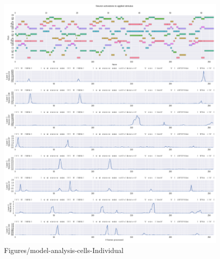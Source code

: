 \documentclass[dissertation.tex]{subfiles}
\begin{document}
\begin{figure}[htpb]
    \centering
    \includegraphics[width=1.0\linewidth]{Figures/model-analysis-cells-individual.png}
    \caption{Figures/model-analysis-cells-Individual}
    \label{fig:Figures/model-analysis-cells-individual}
\end{figure}


\printbibliography
\end{document}
